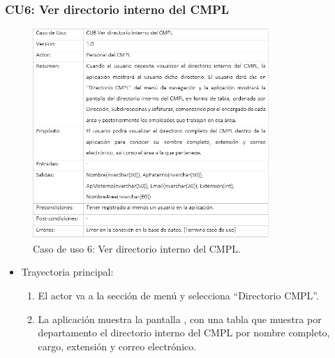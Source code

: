 		\subsubsection{CU6: Ver directorio interno del CMPL}
			\begin{figure}[htbp!]
				\centering
					\includegraphics[width=0.8\textwidth]{images/CU/CU6}
					\caption{Caso de uso 6: Ver directorio interno del CMPL.}
				\label{Tabla}
			\end{figure}
			
			\begin{itemize}
				\item Trayectoria principal:
					\begin{enumerate}
						\item El actor va a la sección de menú y selecciona ``Directorio CMPL''.
						\item La aplicación muestra la pantalla , con una tabla que muestra por departamento el directorio interno del CMPL por nombre completo, cargo, extensión y correo electrónico.
					\end{enumerate}
			\end{itemize}
			
